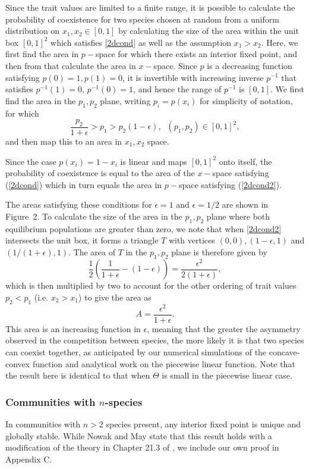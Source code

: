 Since the trait values are limited to a finite range, it is possible to calculate the probability of coexistence for two species chosen at random from a uniform distribution on $x_1,x_2 \in [0,1]$  by calculating the size of the area within the unit box $[0,1]^2$ which satisfies \eqref{2dcond} as well as the assumption $x_1>x_2$. Here, we first find the area in $p-$space for which there exists an interior fixed point, and then from that calculate the area in $x-$space. Since $p$ is a decreasing function satisfying $p(0)=1, p(1)=0$, it is invertible with increasing inverse $p^{-1}$ that satisfies $p^{-1}(1)=0, \, p^{-1}(0)=1$, and hence the range of $p^{-1}$ is $[0,1]$. We first find the area in the $p_1,p_2$ plane, writing $p_i=p(x_i)$ for simplicity of notation, for which
\begin{equation}
\label{2dcond2}
\frac{p_2}{1+\epsilon}>p_1>p_2(1-\epsilon),\;\; (p_1,p_2)\in [0,1]^2,
\end{equation}
and then map this to an area in $x_1,x_2$ space.


Since the case $p(x_i)=1-x_i$ is linear and maps $[0,1]^2$ onto itself, the probability of coexistence is equal to the area of the $x-$space satisfying (\ref{2dcond}) which in turn equals the area in $p-$space satisfying (\ref{2dcond2}).

The areas satisfying these conditions for $\epsilon=1$ and $\epsilon=1/2$ are shown in Figure~2. To calculate the size of the area in the $p_1,p_2$ plane where both equilibrium populations are greater than zero, we note that when \eqref{2dcond2} intersects the unit box, it forms a triangle $T$ with vertices $(0,0),(1-\epsilon,1)$ and $(1/(1+\epsilon),1)$. The area of $T$ in the $p_1,p_2$ plane is therefore given by
\[
\frac{1}{2}\left(\frac{1}{1+\epsilon}-(1-\epsilon)\right)=\frac{\epsilon^2}{2(1+\epsilon)},
\]
which is then multiplied by two to account for the other ordering of trait values $p_2<p_1$ (i.e. $x_2>x_1$) to give the area as
\[
A =\frac{\epsilon^2}{1+\epsilon}.
\]
This area is an increasing function in $\epsilon$, meaning that the greater the asymmetry observed in the competition between species, the more likely it is that two species can coexist together, as anticipated by our numerical simulations of the concave-convex function and analytical work on the piecewise linear function. Note that the result here is identical to that when $\Theta$ is small in the piecewise linear case.

 
\subsubsection{Communities with $n$-species}
In communities with $n>2$ species present,  any interior fixed point is unique and globally stable. While Nowak and May \cite{nowak1994superinfection} state that this result holds with a modification of the theory in Chapter 21.3 of \cite{hofbauer1998evolutionary}, we include our own proof in Appendix C. 


